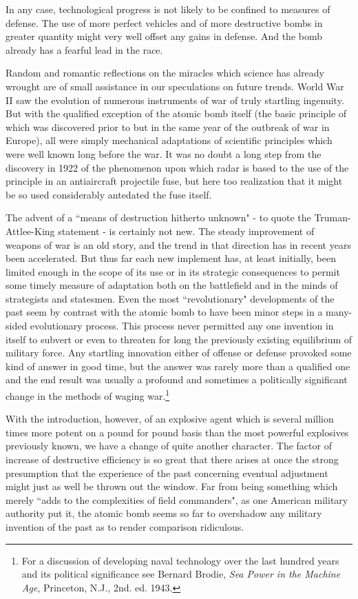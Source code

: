 In any case, technological progress is not likely to be confined to measures of defense. The use of more perfect vehicles and of more destructive bombs in greater quantity might very well offset any gains in defense. And the bomb already has a fearful lead in the race.

Random and romantic reflections on the miracles which science has already wrought are of small assistance in our speculations on future trends. World War II saw the evolution of numerous instruments of war of truly startling ingenuity. But with the qualified exception of the atomic bomb itself (the basic principle of which was discovered prior to but in the same year of the outbreak of war in Europe), all were simply mechanical adaptations of scientific principles which were well known long before the war. It was no doubt a long step from the discovery in 1922 of the phenomenon upon which radar is based to the use of the principle in an antiaircraft projectile fuse, but here too realization that it might be so used considerably antedated the fuse itself.

The advent of a ``means of destruction hitherto unknown" - to quote the Truman-Attlee-King statement - is certainly not new. The steady improvement of weapons of war is an old story, and the trend in that direction has in recent years been accelerated. But thus far each new implement has, at least initially, been limited enough in the scope of its use or in its strategic consequences to permit some timely measure of adaptation both on the battlefield and in the minds of strategists and statesmen. Even the most ``revolutionary" developments of the past seem by contrast with the atomic bomb to have been minor steps in a many-sided evolutionary process. This process never permitted any one invention in itself to subvert or even to threaten for long the previously existing equilibrium of military force. Any startling innovation either of offense or defense provoked some kind of answer in good time, but the answer was rarely more than a qualified one and the end result was usually a profound and sometimes a politically significant change in the methods of waging war.\footnote{For a discussion of developing naval technology over the last hundred years and its political significance see Bernard Brodie, \textit{Sea Power in the Machine Age}, Princeton, N.J., 2nd. ed. 1943.}

With the introduction, however, of an explosive agent which is several million times more potent on a pound for pound basis than the most powerful explosives previously known, we have a change of quite another character. The factor of increase of destructive efficiency is so great that there arises at once the strong presumption that the experience of the past concerning eventual adjustment might just as well be thrown out the window. Far from being something which merely ``adds to the complexities of field commanders", as one American military authority put it, the atomic bomb seems so far to overshadow any military invention of the past as to render comparison ridiculous.

